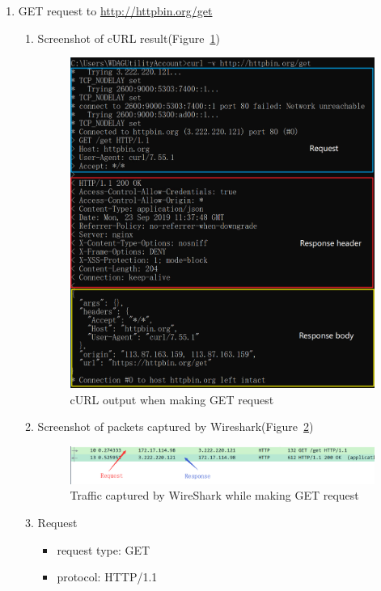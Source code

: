 \documentclass[12pt,letterpaper]{ctexart}
\begin{document}
\begin{enumerate}
  \item GET request to \url{http://httpbin.org/get}
    \begin{enumerate}
      \item Screenshot of cURL result(Figure~\ref{fig:get_cmd})
        \begin{figure}[H]
          \centering
          \includegraphics[width=0.8\linewidth]{assets/get_cmd.png}
          \caption{cURL output when making GET request}
          \label{fig:get_cmd}
        \end{figure}
      \item Screenshot of packets captured by Wireshark(Figure~\ref{fig:get_ws})
        \begin{figure}[H]
          \centering
          \includegraphics[width=0.8\linewidth]{assets/get_wireshark.png}
          \caption{Traffic captured by WireShark while making GET request}
          \label{fig:get_ws}
        \end{figure}
      \newpage
      \item Request
        \begin{itemize}
          \item request type: GET
          \item protocol: HTTP/1.1

\end{itemize}
\end{enumerate}
\end{enumerate}
\end{document}
